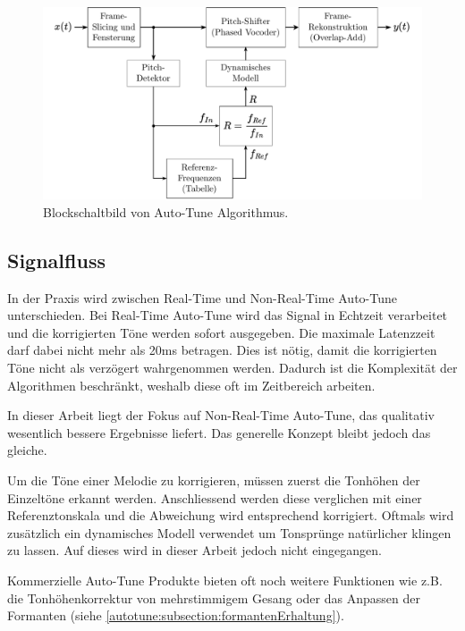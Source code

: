 \begin{figure}
	\centering
	\includegraphics[width=\textwidth]{papers/autotune/images/Blockdiagram.pdf}
	\caption{Blockschaltbild von Auto-Tune Algorithmus.}
    \label{autotune:fig:blockschaltbild}
\end{figure}


\subsection{Signalfluss}
\label{autotune:subsection:signalfluss}
In der Praxis wird zwischen Real-Time und Non-Real-Time Auto-Tune unterschieden.
Bei Real-Time Auto-Tune wird das Signal in Echtzeit verarbeitet und die korrigierten Töne werden sofort ausgegeben.
Die maximale Latenzzeit darf dabei nicht mehr als 20\;ms betragen.
Dies ist nötig, damit die korrigierten Töne nicht als verzögert wahrgenommen werden.
Dadurch ist die Komplexität der Algorithmen beschränkt, weshalb diese oft im Zeitbereich arbeiten.

In dieser Arbeit liegt der Fokus auf Non-Real-Time Auto-Tune, das qualitativ wesentlich bessere Ergebnisse liefert.
Das generelle Konzept bleibt jedoch das gleiche.

Um die Töne einer Melodie zu korrigieren, müssen zuerst die Tonhöhen der Einzeltöne erkannt werden.
Anschliessend werden diese verglichen mit einer Referenztonskala und die Abweichung wird entsprechend korrigiert.
Oftmals wird zusätzlich ein dynamisches Modell verwendet um Tonsprünge natürlicher klingen zu lassen.
Auf dieses wird in dieser Arbeit jedoch nicht eingegangen.

Kommerzielle Auto-Tune Produkte bieten oft noch weitere Funktionen wie z.B. die Tonhöhenkorrektur von mehrstimmigem Gesang oder das Anpassen der Formanten (siehe \ref{autotune:subsection:formantenErhaltung}).
